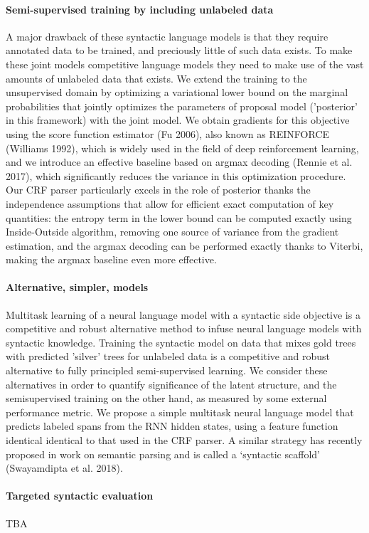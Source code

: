 \paragraph{Semi-supervised training by including unlabeled data}
A major drawback of these syntactic language models is that they require annotated data to be trained, and preciously little of such data exists. To make these joint models competitive language models they need to make use of the vast amounts of unlabeled data that exists. We extend the training to the unsupervised domain by optimizing a variational lower bound on the marginal probabilities that jointly optimizes the parameters of proposal model ('posterior' in this framework) with the joint model. We obtain gradients for this objective using the score function estimator (Fu 2006), also known as REINFORCE (Williams 1992), which is widely used in the field of deep reinforcement learning, and we introduce an effective baseline based on argmax decoding (Rennie et al. 2017), which significantly reduces the variance in this optimization procedure. Our CRF parser particularly excels in the role of posterior thanks the independence assumptions that allow for efficient exact computation of key quantities: the entropy term in the lower bound can be computed exactly using Inside-Outside algorithm, removing one source of variance from the gradient estimation, and the argmax decoding can be performed exactly thanks to Viterbi, making the argmax baseline even more effective.

\paragraph{Alternative, simpler, models}
Multitask learning of a neural language model with a syntactic side objective is a competitive and robust alternative method to infuse neural language models with syntactic knowledge. Training the syntactic model on data that mixes gold trees with predicted 'silver' trees for unlabeled data is a competitive and robust alternative to fully principled semi-supervised learning. We consider these alternatives in order to quantify significance of the latent structure, and the semisupervised training on the other hand, as measured by some external performance metric. We propose a simple multitask neural language model that predicts labeled spans from the RNN hidden states, using a feature function identical identical to that used in the CRF parser. A similar strategy has recently proposed in work on semantic parsing and is called a `syntactic scaffold'
(Swayamdipta et al. 2018).

\paragraph{Targeted syntactic evaluation}
TBA

